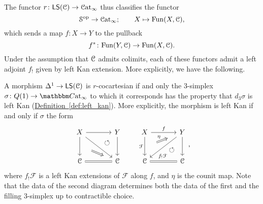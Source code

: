 \documentclass[main.tex]{subfiles}
\begin{document}
The functor $r\colon \mathsf{LS}(\mathcal{C}) \to \mathcal{C}\mathrm{at}_{\infty}$ thus classifies the functor
\begin{equation*}
  \mathcal{S}^{\mathrm{op}} \to \mathcal{C}\mathrm{at}_{\infty};\qquad X \mapsto \mathrm{Fun}(X, \mathcal{C}),
\end{equation*}
which sends a map $f\colon X \to Y$ to the pullback
\begin{equation*}
  f^{*}\colon \mathrm{Fun}(Y, \mathcal{C}) \to \mathrm{Fun}(X, \mathcal{C}).
\end{equation*}
Under the assumption that $\mathcal{C}$ admits colimits, each of these functors admit a left adjoint $f_{!}$ given by left Kan extension. More explicitly, we have the following.
\begin{proposition}
  A morphism $\Delta^{1} \to \mathsf{LS}(\mathcal{C})$ is $r$-cocartesian if and only the 3-simplex $\sigma\colon Q(1) \to \ICCat$ to which it corresponds has the property that $d_{3}\sigma$ is left Kan (\hyperref[def:left_kan]{Definition~\ref*{def:left_kan}}). More explicitly, the morphism is left Kan if and only if $\sigma$ the form
  \begin{equation*}
    \begin{tikzcd}[column sep=large, row sep=large]
      X
      \arrow[r]
      \arrow[d, ""{name=L, right}]
      \arrow[dr]
      & Y
      \arrow[d, ""{name=R, left}]
      \arrow[from=l, to=R, phantom, near end, "\circlearrowleft"{description}]
      \\
      \category{C}
      & \category{C}
      \arrow[l, equals]
      \arrow[from=L, Rightarrow, shorten=3ex]
    \end{tikzcd}
    \qquad
    \begin{tikzcd}[column sep=large, row sep=large]
      X
      \arrow[r, "f"]
      \arrow[d, "\mathcal{F}"{swap}, ""{name=L, right}]
      & Y
      \arrow[d, ""{name=R, left}]
      \arrow[dl, near end, "f_{!}\mathcal{F}"]
      \\
      \category{C}
      \arrow[from=R, phantom, near start, "\circlearrowleft"{description}]
      & \category{C}
      \arrow[l, equals]
      \arrow[from=L, to=u, shorten=3ex, Rightarrow, "\eta"]
    \end{tikzcd},
  \end{equation*}
  where $f_{!}\mathcal{F}$ is a left Kan extensions of $\mathcal{F}$ along $f$, and $\eta$ is the counit map. Note that the data of the second diagram determines both the data of the first and the filling 3-simplex up to contractible choice.
\end{proposition}
\end{document}
